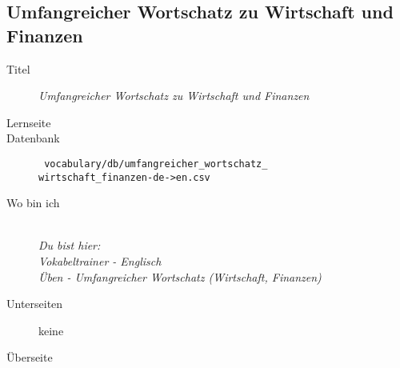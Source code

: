 \subsection{ Umfangreicher Wortschatz zu Wirtschaft und Finanzen }
\label{has:voc-practice-page5}
\begin{description}
	\item[Titel] \emph{ Umfangreicher Wortschatz zu Wirtschaft und Finanzen }
	\item[Lernseite] 
	\item[Datenbank] \texttt{ vocabulary/db/umfangreicher\_wortschatz\_\\wirtschaft\_finanzen-de->en.csv }
	\item[Wo bin ich] \emph{\\Du bist hier:\\Vokabeltrainer - Englisch\\Üben - Umfangreicher Wortschatz (Wirtschaft, Finanzen)}
	\item[Unterseiten] keine
	\item[Überseite] 
\end{description}

